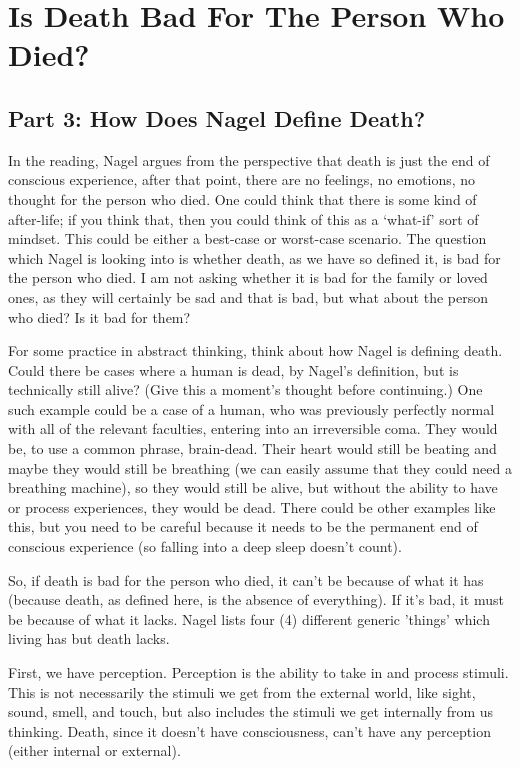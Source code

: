 \part{Is Death Bad For The Person Who Died?}
\label{ch.modtwo}

\chapter{Part 3: How Does Nagel Define Death?}
In the reading, Nagel argues from the perspective that death is just the end of conscious experience, after that point, there are no feelings, no emotions, no thought for the person who died. One could think that there is some kind of after-life; if you think that, then you could think of this as a ‘what-if’ sort of mindset. This could be either a best-case or worst-case scenario. The question which Nagel is looking into is whether death, as we have so defined it, is bad for the person who died. I am not asking whether it is bad for the family or loved ones, as they will certainly be sad and that is bad, but what about the person who died? Is it bad for them?

For some practice in abstract thinking, think about how Nagel is defining death. Could there be cases where a human is dead, by Nagel's definition, but is technically still alive? (Give this a moment's thought before continuing.) One such example could be a case of a human, who was previously perfectly normal with all of the relevant faculties, entering into an irreversible coma. They would be, to use a common phrase, brain-dead. Their heart would still be beating and maybe they would still be breathing (we can easily assume that they could need a breathing machine), so they would still be alive, but without the ability to have or process experiences, they would be dead. There could be other examples like this, but you need to be careful because it needs to be the permanent end of conscious experience (so falling into a deep sleep doesn't count).  

So, if death is bad for the person who died, it can't be because of what it has (because death, as defined here, is the absence of everything). If it's bad, it must be because of what it lacks. Nagel lists four (4) different generic 'things' which living has but death lacks. 

First, we have perception. Perception is the ability to take in and process stimuli. This is not necessarily the stimuli we get from the external world, like sight, sound, smell, and touch, but also includes the stimuli we get internally from us thinking. Death, since it doesn't have consciousness, can't have any perception (either internal or external). 

